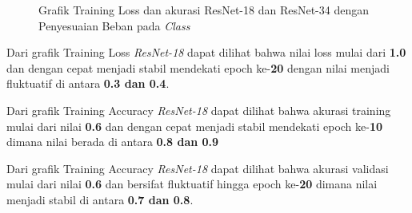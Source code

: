 \begin{figure}[hbtp]
	\centering
	\qquad
	\caption{Grafik Training Loss dan akurasi ResNet-18 dan ResNet-34 dengan Penyesuaian Beban pada \emph{Class}}
	\label{fig:graphTrainingWeightedPt1}
\end{figure}

Dari grafik Training Loss \emph{ResNet-18} dapat dilihat bahwa nilai loss mulai dari \textbf{1.0} dan dengan cepat menjadi stabil mendekati epoch ke-\textbf{20} dengan nilai menjadi fluktuatif di antara \textbf{0.3 dan 0.4}.

Dari grafik Training Accuracy \emph{ResNet-18} dapat dilihat bahwa akurasi training mulai dari nilai \textbf{0.6} dan dengan cepat menjadi stabil mendekati epoch ke-\textbf{10} dimana nilai berada di antara \textbf{0.8 dan 0.9} 

Dari grafik Training Accuracy \emph{ResNet-18} dapat dilihat bahwa akurasi validasi mulai dari nilai \textbf{0.6} dan bersifat fluktuatif hingga epoch ke-\textbf{20} dimana nilai menjadi stabil di antara \textbf{0.7 dan 0.8}.


